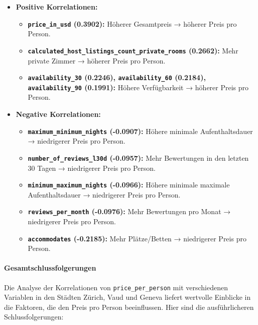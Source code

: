 \documentclass[
  journal,
]{IEEEtran}%
\let\oldparagraph\paragraph
\renewcommand{\paragraph}[1]{\oldparagraph{#1}\mbox{}}
\providecommand{\tightlist}{%
  \setlength{\itemsep}{0pt}\setlength{\parskip}{0pt}}\usepackage{longtable,booktabs,array}
\begin{document}
\begin{itemize}
\item
  \textbf{Positive Korrelationen:}

  \begin{itemize}
  \tightlist
  \item
    \textbf{\texttt{price\_in\_usd} (0.3902):} Höherer Gesamtpreis →
    höherer Preis pro Person.
  \item
    \textbf{\texttt{calculated\_host\_listings\_count\_private\_rooms}
    (0.2662):} Mehr private Zimmer → höherer Preis pro Person.
  \item
    \textbf{\texttt{availability\_30} (0.2246),
    \texttt{availability\_60} (0.2184), \texttt{availability\_90}
    (0.1991):} Höhere Verfügbarkeit → höherer Preis pro Person.
  \end{itemize}
\item
  \textbf{Negative Korrelationen:}

  \begin{itemize}
  \tightlist
  \item
    \textbf{\texttt{maximum\_minimum\_nights} (-0.0907):} Höhere
    minimale Aufenthaltsdauer → niedrigerer Preis pro Person.
  \item
    \textbf{\texttt{number\_of\_reviews\_l30d} (-0.0957):} Mehr
    Bewertungen in den letzten 30 Tagen → niedrigerer Preis pro Person.
  \item
    \textbf{\texttt{minimum\_maximum\_nights} (-0.0966):} Höhere
    minimale maximale Aufenthaltsdauer → niedrigerer Preis pro Person.
  \item
    \textbf{\texttt{reviews\_per\_month} (-0.0976):} Mehr Bewertungen
    pro Monat → niedrigerer Preis pro Person.
  \item
    \textbf{\texttt{accommodates} (-0.2185):} Mehr Plätze/Betten →
    niedrigerer Preis pro Person.
  \end{itemize}
\end{itemize}

\hypertarget{gesamtschlussfolgerungen}{%
\paragraph{Gesamtschlussfolgerungen}\label{gesamtschlussfolgerungen}}

Die Analyse der Korrelationen von \texttt{price\_per\_person} mit
verschiedenen Variablen in den Städten Zürich, Vaud und Geneva liefert
wertvolle Einblicke in die Faktoren, die den Preis pro Person
beeinflussen. Hier sind die ausführlicheren Schlussfolgerungen:
\end{document}
